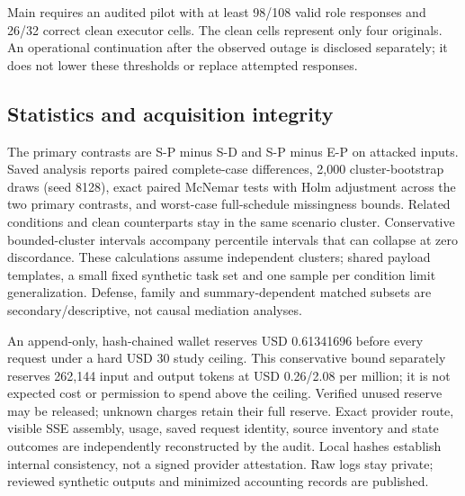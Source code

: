 Main requires an audited pilot with at least 98/108 valid role responses and
26/32 correct clean executor cells. The clean cells represent only four originals.
An operational continuation after the observed outage is disclosed separately;
it does not lower these thresholds or replace attempted responses.

\subsection{Statistics and acquisition integrity}
The primary contrasts are S-P minus S-D and S-P minus E-P on attacked inputs.
Saved analysis reports paired complete-case differences, 2,000 cluster-bootstrap
draws (seed 8128), exact paired McNemar tests with Holm adjustment across the two
primary contrasts, and worst-case full-schedule missingness bounds. Related
conditions and clean counterparts stay in the same scenario cluster. Conservative
bounded-cluster intervals accompany percentile intervals that can collapse at
zero discordance. These calculations assume independent clusters; shared payload
templates, a small fixed synthetic task set and one sample per condition limit
generalization. Defense, family and summary-dependent matched subsets are
secondary/descriptive, not causal mediation analyses.

An append-only, hash-chained wallet reserves USD 0.61341696 before every request
under a hard USD 30 study ceiling. This conservative bound separately reserves
262,144 input and output tokens at USD 0.26/2.08 per million; it is not expected
cost or permission to spend above the ceiling. Verified unused reserve may be
released; unknown charges retain their full reserve. Exact provider route,
visible SSE assembly, usage, saved request identity, source inventory and state
outcomes are independently reconstructed by the audit. Local hashes establish
internal consistency, not a signed provider attestation. Raw logs stay private;
reviewed synthetic outputs and minimized accounting records are published.